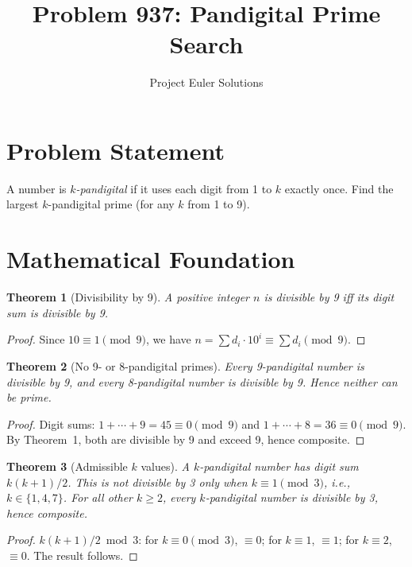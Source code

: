 \documentclass[11pt]{article}
\title{Problem 937: Pandigital Prime Search}
\author{Project Euler Solutions}
\date{}
\newtheorem{theorem}{Theorem}
\theoremstyle{definition}
\begin{document}
\maketitle

\section{Problem Statement}

A number is \emph{$k$-pandigital} if it uses each digit from 1 to $k$ exactly once. Find the largest $k$-pandigital prime (for any $k$ from 1 to 9).

\section{Mathematical Foundation}

\begin{theorem}[Divisibility by 9]
A positive integer $n$ is divisible by 9 iff its digit sum is divisible by 9.
\end{theorem}

\begin{proof}
Since $10 \equiv 1 \pmod{9}$, we have $n = \sum d_i \cdot 10^i \equiv \sum d_i \pmod{9}$.
\end{proof}

\begin{theorem}[No 9- or 8-pandigital primes]
Every 9-pandigital number is divisible by 9, and every 8-pandigital number is divisible by 9. Hence neither can be prime.
\end{theorem}

\begin{proof}
Digit sums: $1 + \cdots + 9 = 45 \equiv 0 \pmod{9}$ and $1 + \cdots + 8 = 36 \equiv 0 \pmod{9}$. By Theorem~1, both are divisible by 9 and exceed 9, hence composite.
\end{proof}

\begin{theorem}[Admissible $k$ values]
A $k$-pandigital number has digit sum $k(k+1)/2$. This is not divisible by 3 only when $k \equiv 1 \pmod{3}$, i.e., $k \in \{1, 4, 7\}$. For all other $k \geq 2$, every $k$-pandigital number is divisible by 3, hence composite.
\end{theorem}

\begin{proof}
$k(k+1)/2 \bmod 3$: for $k \equiv 0 \pmod{3}$, $\equiv 0$; for $k \equiv 1$, $\equiv 1$; for $k \equiv 2$, $\equiv 0$. The result follows.
\end{proof}
\end{document}
